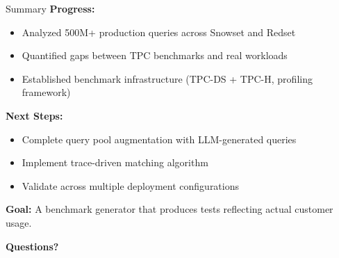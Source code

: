 \documentclass[aspectratio=169]{beamer}
\begin{document}
\begin{frame}{Summary}
    \textbf{Progress:}
    \begin{itemize}
        \item Analyzed 500M+ production queries across Snowset and Redset
        \item Quantified gaps between TPC benchmarks and real workloads
        \item Established benchmark infrastructure (TPC-DS + TPC-H, profiling framework)
    \end{itemize}
    
    \vspace{0.3cm}
    \textbf{Next Steps:}
    \begin{itemize}
        \item Complete query pool augmentation with LLM-generated queries
        \item Implement trace-driven matching algorithm
        \item Validate across multiple deployment configurations
    \end{itemize}
    
    \vspace{0.3cm}
    \textbf{Goal:} A benchmark generator that produces tests reflecting actual customer usage.
\end{frame}

\begin{frame}
    \centering
    \Huge{\textbf{Questions?}}
\end{frame}
\end{document}
